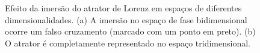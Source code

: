 \begin{figure}[ht]
\centering 
{}
\caption{Efeito da imersão do atrator de Lorenz em espaços de diferentes dimensionalidades. (a) A imersão no espaço de fase bidimensional ocorre um falso cruzamento (marcado com um ponto em preto). (b) O atrator é completamente representado no espaço tridimensional.} 
\label{figatratorhipot}
\end{figure}


